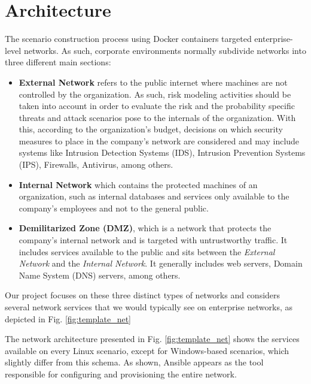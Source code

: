 \section{Architecture} \label{sec:validation_architecture}

The scenario construction process using Docker containers targeted enterprise-level networks. As such, corporate environments normally subdivide networks into three different main sections:

\begin{itemize}
    \item \textbf{External Network} refers to the public internet where machines are not controlled by the organization. As such, risk modeling activities should be taken into account in order to evaluate the risk and the probability specific threats and attack scenarios pose to the internals of the organization. With this, according to the organization's budget, decisions on which security measures to place in the company's network are considered and may include systems like Intrusion Detection Systems (IDS), Intrusion Prevention Systems (IPS), Firewalls, Antivirus, among others.
    \item \textbf{Internal Network} which contains the protected machines of an organization, such as internal databases and services only available to the company's employees and not to the general public.
    \item \textbf{Demilitarized Zone (DMZ)}, which is a network that protects the company's internal network and is targeted with untrustworthy traffic. It includes services available to the public and sits between the \textit{External Network} and the \textit{Internal Network}. It generally includes web servers, Domain Name System (DNS) servers, among others.
\end{itemize}

Our project focuses on these three distinct types of networks and considers several network services that we would typically see on enterprise networks, as depicted in Fig. \ref{fig:template_net}

The network architecture presented in Fig. \ref{fig:template_net} shows the services available on every Linux scenario, except for Windows-based scenarios, which slightly differ from this schema. As shown, Ansible appears as the tool responsible for configuring and provisioning the entire network.

